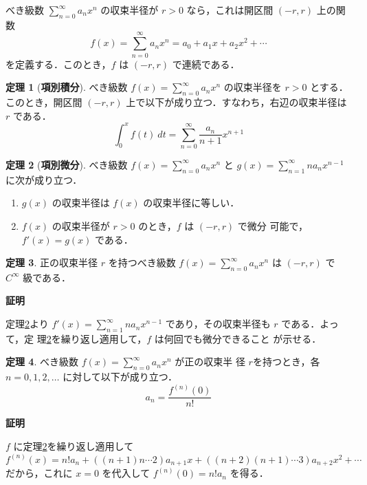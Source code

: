 \documentclass[10pt, uplatex, dvipdfmx]{jsarticle}
\makeatletter
\renewenvironment{proof}[1][\proofname]{\par
  \pushQED{\qed}%
  \normalfont \topsep6\p@\@plus6\p@\relax
  \trivlist
  \item\relax
  {\bfseries
  #1\@addpunct{.}}\hspace\labelsep\ignorespaces
}{%
  \popQED\endtrivlist\@endpefalse
}
\theoremstyle{definition}
\newtheorem{theorem}{定理}[section]
\renewcommand{\proofname}{\textbf{証明}}
\numberwithin{equation}{section}
\newcommand{\ds}{\displaystyle}
\makeatother
\begin{document}
べき級数 $\ds \sum_{n=0}^{\infty} a_n x^n$ の収束半径が $r>0$ なら，これは開区間 $(-r,r)$ 上の関数
\[
  f(x) = \sum_{n=0}^{\infty} a_n x^n = a_0 + a_1 x + a_2 x^2 + \cdots
\]
を定義する．このとき，$f$ は $(-r,r)$ で連続である．

\begin{theorem}[\textbf{項別積分}]\label{thm:term-int}
  べき級数 $\ds f(x) = \sum_{n=0}^{\infty} a_n x^n$ の収束半径を $r>0$
  とする．このとき，開区間 $(-r,r)$ 上で以下が成り立つ．すなわち，右辺の収束半径は $r$ である．
  \[
    \int_{0}^{x} f(t) \ dt = \sum_{n=0}^{\infty} \frac{a_n}{n+1}x^{n+1}
  \]
\end{theorem}

\begin{theorem}[\textbf{項別微分}]\label{thm:term-diff}
  べき級数 $\ds f(x) = \sum_{n=0}^{\infty} a_n x^n$ と
  $\ds g(x) = \sum_{n=1}^{\infty} na_n x^{n-1}$ に次が成り立つ．
  \begin{enumerate}[(1)]
    
  \item $g(x)$ の収束半径は $f(x)$ の収束半径に等しい．

  \item $f(x)$ の収束半径が $r>0$ のとき，$f$ は $(-r,r)$ で微分
    可能で，$f'(x) = g(x)$ である．
  \end{enumerate}
\end{theorem}

\begin{theorem}
  正の収束半径 $r$ を持つべき級数 $\ds f(x) = \sum_{n=0}^{\infty} a_n
  x^n$ は $(-r,r)$ で $C^{\infty}$ 級である．
\end{theorem}
\begin{proof}
  定理\ref{thm:term-diff}より $\ds f'(x) = \sum_{n=1}^{\infty} n a_n
  x^{n-1}$ であり，その収束半径も $r$ である．よって，定
  理\ref{thm:term-diff}を繰り返し適用して，$f$ は何回でも微分できること
  が示せる．
\end{proof}

\begin{theorem}\label{thm:coeff}
  べき級数 $\ds f(x) = \sum_{n=0}^{\infty} a_n x^n$ が正の収束半
  径 $r$を持つとき，各 $n=0,1,2,\ldots$ に対して以下が成り立つ．
  \[
    a_n = \frac{f^{(n)}(0)}{n!}
  \]
\end{theorem}
\begin{proof}
  $f$ に定理\ref{thm:term-diff}を繰り返し適用して
  \[
    f^{(n)}(x) = n! a_n + \left( (n+1)n \cdots  2\right)a_{n+1} x + \left( (n+2)(n+1)\cdots 3\right) a_{n+2} x^2 + \cdots
  \]
  だから，これに $x=0$ を代入して $f^{(n)}(0) = n! a_n$ を得る．
\end{proof}
\end{document}
